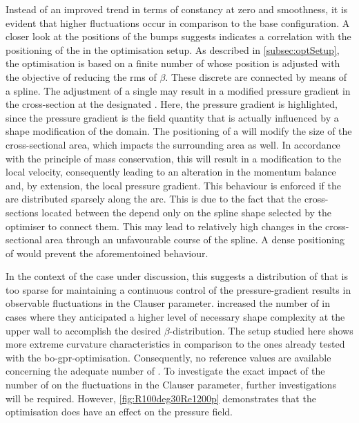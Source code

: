 Instead of an improved trend in terms of constancy at zero and smoothness, it is evident that  higher fluctuations occur  in comparison to the base configuration.
A closer look at the positions of the bumps suggests   indicates a correlation with   the positioning of the  in the optimisation setup.
As described in \autoref{subsec:optSetup}, the optimisation is based on a finite number of  whose position is adjusted with the objective of reducing the  \acrfull{rms} of $\beta$.
These discrete  are connected  by means of a spline. 
The adjustment of a single  may result in a modified pressure gradient in the cross-section  at the designated  .
Here, the pressure gradient is highlighted, since the pressure gradient is the field quantity that is actually influenced by a shape modification of the domain.
The positioning of a  will modify the size of the cross-sectional area, which impacts the surrounding area as well.
In accordance with the principle of mass conservation,  this will result in a modification to  the local velocity,  consequently leading to an alteration in the momentum balance and, by extension, the local pressure gradient.
This behaviour is enforced if the  are distributed sparsely along the arc. This is due to the fact that  the cross-sections located between the  depend only on the spline shape selected by the optimiser to connect them.
This may lead to relatively high changes in the cross-sectional area through an unfavourable course of the spline.
A dense positioning of  would prevent the aforementoined behaviour.



In the context of the case under discussion, this suggests  a distribution of  that is too sparse for  maintaining a continuous control of the pressure-gradient results  in observable fluctuations in the Clauser parameter.
\citet{morita_applying_2022} increased the number of  in cases where they anticipated a higher level of  necessary shape complexity at the upper wall to accomplish the desired $\beta$-distribution.
The setup studied here shows more extreme curvature characteristics  in comparison to  the ones already tested with the \acrshort{bo}-\acrshort{gpr}-optimisation. Consequently, no reference values are available concerning the adequate number of .
To investigate the exact impact of the number of  on the fluctuations in the Clauser parameter, further investigations will be required.
However, \autoref{fig:R100deg30Re1200p} demonstrates that the optimisation does have an effect on  the pressure field.

